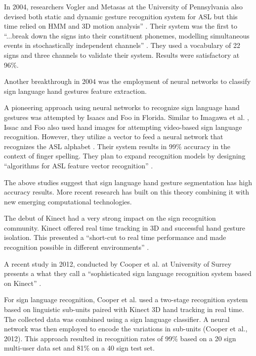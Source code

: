In 2004, researchers Vogler and Metasas at the University of Pennsylvania also devised both static and dynamic gesture recognition system for ASL but this time relied on HMM and 3D motion analysis'' \parencite{Vogler2004}. Their system was the first to ``...break down the signs into their constituent phonemes, modelling simultaneous events in stochastically independent channels'' \parencite{Vogler2004}. They used a vocabulary of 22 signs and three channels to validate their system. Results were satisfactory at 96\%.

Another breakthrough in 2004 was the employment of neural networks to classify sign language hand gestures feature extraction. 

A pioneering approach using neural networks to recognize sign language hand gestures was attempted by Isaacs and Foo in Florida. Similar to Imagawa et al. \parencite{Imagawa2000}, Issac and Foo also used hand images for attempting video-based sign language recognition. However, they utilize a vector to feed a neural network that recognizes the ASL alphabet \parencite{Isaacs2004}. Their system results in 99\% accuracy in the context of finger spelling. They plan to expand recognition models by designing ``algorithms for ASL feature vector recognition'' \parencite{Isaacs2004}.

The above studies suggest that sign language hand gesture segmentation has high accuracy results. More recent research has built on this theory combining it with new emerging computational technologies. 

The debut of Kinect had a very strong impact on the sign recognition community. Kinect offered real time tracking in 3D and successful hand gesture isolation. This presented a ``short-cut to real time performance and made recognition possible in different environments'' \parencite{Cooper2012}.

A recent study in 2012, conducted by Cooper et al. at University of Surrey presents a what they call a ``sophisticated sign language recognition system based on Kinect'' \parencite{Cooper2012}.

For sign language recognition, Cooper et al. used a two-stage recognition system based on linguistic sub-units paired with Kinect 3D hand tracking in real time. The collected data was combined using a sign language classifier. A neural network was then employed to encode the variations in sub-units (Cooper et al., 2012). This approach resulted in recognition rates of 99\% based on a 20 sign multi-user data set and 81\% on a 40 sign test set. 

